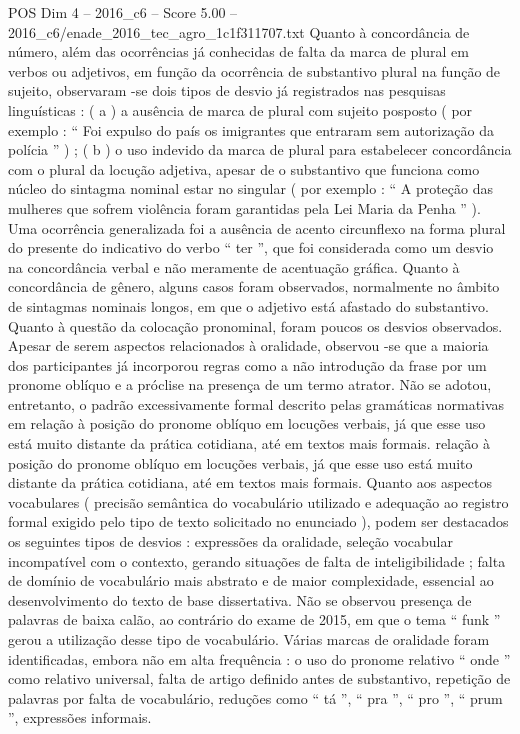 \begin{textsample}{POS Dim 4 – 2016\_c6 – Score 5.00 – 2016\_c6/enade\_2016\_tec\_agro\_1c1f311707.txt}
Quanto à concordância de número, além das ocorrências já conhecidas de falta da marca de plural em verbos ou adjetivos, em função da ocorrência de substantivo plural na função de sujeito, observaram -se dois tipos de desvio já registrados nas pesquisas linguísticas : ( a ) a ausência de marca de plural com sujeito posposto ( por exemplo : “ Foi expulso do país os imigrantes que entraram sem autorização da polícia ” ) ; ( b ) o uso indevido da marca de plural para estabelecer concordância com o plural da locução adjetiva, apesar de o substantivo que funciona como núcleo do sintagma nominal estar no singular ( por exemplo : “ A proteção das mulheres que sofrem violência foram garantidas pela Lei Maria da Penha ” ).
Uma ocorrência generalizada foi a ausência de acento circunflexo na forma plural do presente do indicativo do verbo “ ter ”, que foi considerada como um desvio na concordância verbal e não meramente de acentuação gráfica.
Quanto à concordância de gênero, alguns casos foram observados, normalmente no âmbito de sintagmas nominais longos, em que o adjetivo está afastado do substantivo.
Quanto à questão da colocação pronominal, foram poucos os desvios observados.
Apesar de serem aspectos relacionados à oralidade, observou -se que a maioria dos participantes já incorporou regras como a não introdução da frase por um pronome oblíquo e a próclise na presença de um termo atrator.
Não se adotou, entretanto, o padrão excessivamente formal descrito pelas gramáticas normativas em relação à posição do pronome oblíquo em locuções verbais, já que esse uso está muito distante da prática cotidiana, até em textos mais formais. relação à posição do pronome oblíquo em locuções verbais, já que esse uso está muito distante da prática cotidiana, até em textos mais formais.
Quanto aos aspectos vocabulares ( precisão semântica do vocabulário utilizado e adequação ao registro formal exigido pelo tipo de texto solicitado no enunciado ), podem ser destacados os seguintes tipos de desvios : expressões da oralidade, seleção vocabular incompatível com o contexto, gerando situações de falta de inteligibilidade ; falta de domínio de vocabulário mais abstrato e de maior complexidade, essencial ao desenvolvimento do texto de base dissertativa.
Não se observou presença de palavras de baixa calão, ao contrário do exame de 2015, em que o tema “ funk ” gerou a utilização desse tipo de vocabulário.
Várias marcas de oralidade foram identificadas, embora não em alta frequência : o uso do pronome relativo “ onde ” como relativo universal, falta de artigo definido antes de substantivo, repetição de palavras por falta de vocabulário, reduções como “ tá ”, “ pra ”, “ pro ”, “ prum ”, expressões informais.

\end{textsample}
